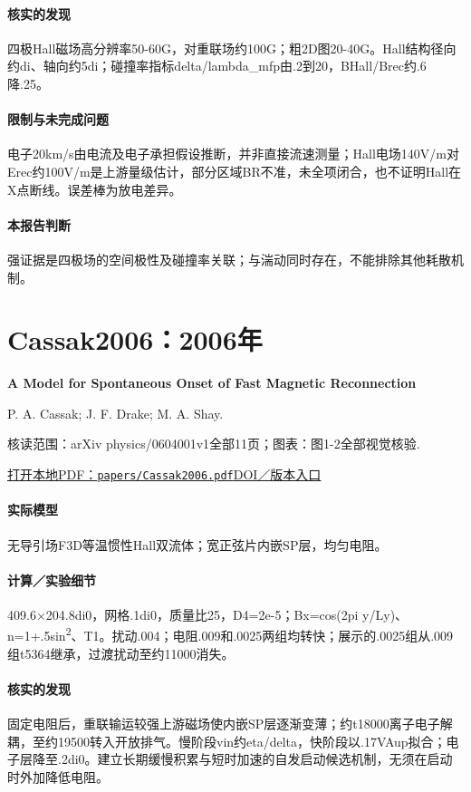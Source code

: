 \paragraph{核实的发现}四极Hall磁场高分辨率50-60G，对重联场约100G；粗2D图20-40G。Hall结构径向约di、轴向约5di；碰撞率指标delta/lambda\_mfp由.2到20，BHall/Brec约.6降.25。

\paragraph{限制与未完成问题}电子20km/s由电流及电子承担假设推断，并非直接流速测量；Hall电场140V/m对Erec约100V/m是上游量级估计，部分区域BR不准，未全项闭合，也不证明Hall在X点断线。误差棒为放电差异。

\paragraph{本报告判断}强证据是四极场的空间极性及碰撞率关联；与湍动同时存在，不能排除其他耗散机制。

\section{Cassak2006：2006年}\label{paper:Cassak2006}

\textbf{A Model for Spontaneous Onset of Fast Magnetic Reconnection}\citep{Cassak2006}\

P. A. Cassak;  J. F. Drake;  M. A. Shay.

\textsf{核读范围：}arXiv physics/0604001v1全部11页；\textsf{图表：}图1-2全部视觉核验.

\href{run:papers/Cassak2006.pdf}{打开本地PDF：\texttt{papers/Cassak2006.pdf}}\quad\href{https://doi.org/10.1086/505690}{DOI／版本入口}

\paragraph{实际模型}无导引场F3D等温惯性Hall双流体；宽正弦片内嵌SP层，均匀电阻。

\paragraph{计算／实验细节}409.6×204.8di0，网格.1di0，质量比25，D4=2e-5；Bx=cos(2pi y/Ly)、n=1+.5sin\textsuperscript{2}、T1。扰动.004；电阻.009和.0025两组均转快；展示的.0025组从.009组t5364继承，过渡扰动至约11000消失。

\paragraph{核实的发现}固定电阻后，重联输运较强上游磁场使内嵌SP层逐渐变薄；约t18000离子电子解耦，至约19500转入开放排气。慢阶段vin约eta/delta，快阶段以.17VAup拟合；电子层降至.2di0。建立长期缓慢积累与短时加速的自发启动候选机制，无须在启动时外加降低电阻。

